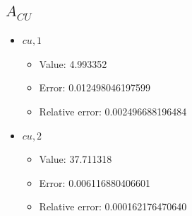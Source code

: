 \documentclass{article}%
\begin{document}
\subsection{$A_{CU}$}%
\begin{itemize}%
	\item $\textit{cu},1$%
	\begin{itemize}%
		\item Value: 4.993352%
		\item Error: 0.012498046197599%
		\item Relative error: 0.002496688196484%
	\end{itemize}%
	\item $\textit{cu},2$%
	\begin{itemize}%
		\item Value: 37.711318%
		\item Error: 0.006116880406601%
		\item Relative error: 0.000162176470640%
	\end{itemize}%
\end{itemize}%
\end{document}
